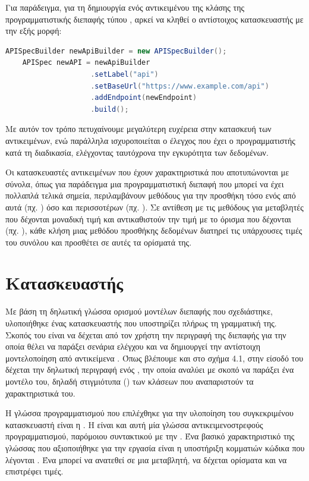Για παράδειγμα, για τη δημιουργία ενός αντικειμένου της κλάσης της προγραμματιστικής διεπαφής τύπου ,
αρκεί να κληθεί ο αντίστοιχος κατασκευαστής με την εξής μορφή:


\begin{lstlisting}[language=java]
    APISpecBuilder newApiBuilder = new APISpecBuilder();
    APISpec newAPI = newApiBuilder
                    .setLabel("api")
                    .setBaseUrl("https://www.example.com/api")
                    .addEndpoint(newEndpoint)
                    .build();
\end{lstlisting}


Με αυτόν τον τρόπο πετυχαίνουμε μεγαλύτερη ευχέρεια στην κατασκευή των αντικειμένων,
ενώ παράλληλα ισχυροποιείται ο έλεγχος που έχει ο προγραμματιστής κατά τη διαδικασία,
ελέγχοντας ταυτόχρονα την εγκυρότητα των δεδομένων.

Οι κατασκευαστές αντικειμένων που έχουν χαρακτηριστικά που αποτυπώνονται με σύνολα,
όπως για παράδειγμα μια προγραμματιστική διεπαφή που μπορεί να έχει πολλαπλά τελικά σημεία,
περιλαμβάνουν μεθόδους για την προσθήκη τόσο ενός από αυτά (πχ. ) 
όσο και περισσοτέρων (πχ. ).
Σε αντίθεση με τις μεθόδους για μεταβλητές που δέχονται μοναδική τιμή και αντικαθιστούν την τιμή με το όρισμα που δέχονται (πχ. ),
κάθε κλήση μιας μεθόδου προσθήκης δεδομένων διατηρεί τις υπάρχουσες τιμές του συνόλου και προσθέτει σε αυτές τα ορίσματά της.

\section{Κατασκευαστής }

Με βάση τη δηλωτική γλώσσα ορισμού μοντέλων διεπαφής που σχεδιάστηκε,
υλοποιήθηκε ένας κατασκευαστής που υποστηρίζει πλήρως τη γραμματική της.
Σκοπός του είναι να δέχεται από τον χρήστη την περιγραφή της διεπαφής για την οποία θέλει να παράξει σενάρια ελέγχου
και να δημιουργεί την αντίστοιχη μοντελοποίηση από αντικείμενα . 
Όπως βλέπουμε και στο σχήμα 4.1, 
στην είσοδό του δέχεται την δηλωτική περιγραφή ενός ,
την οποία αναλύει με σκοπό να παράξει ένα  μοντέλο του,
δηλαδή στιγμιότυπα () των κλάσεων  που αναπαριστούν τα χαρακτηριστικά του.

Η γλώσσα προγραμματισμού που επιλέχθηκε για την υλοποίηση του συγκεκριμένου κατασκευαστή είναι η .
Η  είναι και αυτή μία γλώσσα αντικειμενοστρεφούς προγραμματισμού,
παρόμοιου συντακτικού με την .
Ένα βασικό χαρακτηριστικό της γλώσσας  που αξιοποιήθηκε για την εργασία 
είναι η υποστήριξη κομματιών κώδικα που λέγονται .
Ένα  μπορεί να ανατεθεί σε μια μεταβλητή,
να δέχεται ορίσματα και να επιστρέφει τιμές.

